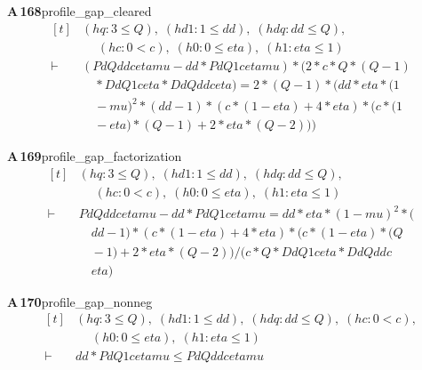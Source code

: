 \documentclass[conference]{IEEEtran}
\theoremstyle{definition}
\newcommand{\lean}[1]{\textsf{\footnotesize #1}}
\begin{document}
\noindent\textbf{A\,168}\quad\lean{profile\_gap\_cleared}
{\footnotesize\[ \begin{aligned}[t]
&(\mathit{hq} : 3 \leq \mathit{Q}),\; (\mathit{hd1} : 1 \leq \mathit{dd}),\; (\mathit{hdq} : \mathit{dd} \leq \mathit{Q}),\\
&\quad \; (\mathit{hc} : 0 < \mathit{c}),\; (\mathit{h0} : 0 \leq \mathit{eta}),\; (\mathit{h1} : \mathit{eta} \leq 1)\\
\vdash\;&(\mathit{Pd} \mathit{Q} \mathit{dd} \mathit{c} \mathit{eta} \mathit{mu} - \mathit{dd} * \mathit{Pd} \mathit{Q} 1 \mathit{c} \mathit{eta} \mathit{mu}) * (2 * \mathit{c} * \mathit{Q} * (\mathit{Q} - 1)\\
&\quad * \mathit{Dd} \mathit{Q} 1 \mathit{c} \mathit{eta} * \mathit{Dd} \mathit{Q} \mathit{dd} \mathit{c} \mathit{eta}) = 2 * (\mathit{Q} - 1) * (\mathit{dd} * \mathit{eta} * (1\\
&\quad - \mathit{mu}) ^{2} * (\mathit{dd} - 1) * (\mathit{c} * (1 - \mathit{eta}) + 4 * \mathit{eta}) * (\mathit{c} * (1\\
&\quad - \mathit{eta}) * (\mathit{Q} - 1) + 2 * \mathit{eta} * (\mathit{Q} - 2)))
\end{aligned} \]}

\noindent\textbf{A\,169}\quad\lean{profile\_gap\_factorization}
{\footnotesize\[ \begin{aligned}[t]
&(\mathit{hq} : 3 \leq \mathit{Q}),\; (\mathit{hd1} : 1 \leq \mathit{dd}),\; (\mathit{hdq} : \mathit{dd} \leq \mathit{Q}),\\
&\quad \; (\mathit{hc} : 0 < \mathit{c}),\; (\mathit{h0} : 0 \leq \mathit{eta}),\; (\mathit{h1} : \mathit{eta} \leq 1)\\
\vdash\;&\mathit{Pd} \mathit{Q} \mathit{dd} \mathit{c} \mathit{eta} \mathit{mu} - \mathit{dd} * \mathit{Pd} \mathit{Q} 1 \mathit{c} \mathit{eta} \mathit{mu} = \mathit{dd} * \mathit{eta} * (1 - \mathit{mu}) ^{2} * (\\
&\quad \mathit{dd} - 1) * (\mathit{c} * (1 - \mathit{eta}) + 4 * \mathit{eta}) * (\mathit{c} * (1 - \mathit{eta}) * (\mathit{Q}\\
&\quad - 1) + 2 * \mathit{eta} * (\mathit{Q} - 2)) / (\mathit{c} * \mathit{Q} * \mathit{Dd} \mathit{Q} 1 \mathit{c} \mathit{eta} * \mathit{Dd} \mathit{Q} \mathit{dd} \mathit{c}\\
&\quad \mathit{eta})
\end{aligned} \]}

\noindent\textbf{A\,170}\quad\lean{profile\_gap\_nonneg}
{\footnotesize\[ \begin{aligned}[t]
&(\mathit{hq} : 3 \leq \mathit{Q}),\; (\mathit{hd1} : 1 \leq \mathit{dd}),\; (\mathit{hdq} : \mathit{dd} \leq \mathit{Q}),\; (\mathit{hc} : 0 < \mathit{c}),\\
&\quad \; (\mathit{h0} : 0 \leq \mathit{eta}),\; (\mathit{h1} : \mathit{eta} \leq 1)\\
\vdash\;&\mathit{dd} * \mathit{Pd} \mathit{Q} 1 \mathit{c} \mathit{eta} \mathit{mu} \leq \mathit{Pd} \mathit{Q} \mathit{dd} \mathit{c} \mathit{eta} \mathit{mu}
\end{aligned} \]}
\end{document}
